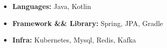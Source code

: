 \documentclass[10pt, letterpaper]{article}
\newenvironment{highlights}{
    \begin{itemize}[
        topsep=0.10 cm,
        parsep=0.10 cm,
        partopsep=0pt,
        itemsep=0pt,
        leftmargin=0.4 cm + 10pt
    ]
    }{
    \end{itemize}
} %
\begin{document}
    \begin{highlights}
        \item \textbf{Languages:} Java, Kotlin
    \end{highlights}

    \vspace{0.2 cm}

    \begin{highlights}
        \item \textbf{Framework \&& Library:} Spring, JPA, Gradle
    \end{highlights}

    \vspace{0.2 cm}

    \begin{highlights}
        \item \textbf{Infra: } Kubernetes, Mysql, Redis, Kafka
    \end{highlights}
\end{document}
